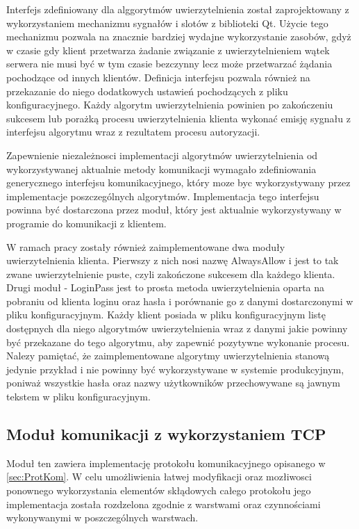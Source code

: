 Interfejs zdefiniowany dla alggorytmów uwierzytelnienia został
zaprojektowany z wykorzystaniem mechanizmu sygnałów i slotów z
biblioteki Qt. Użycie tego mechanizmu pozwala na znacznie bardziej
wydajne wykorzystanie zasobów, gdyż w czasie gdy klient przetwarza
żadanie związanie z uwierzytelnieniem wątek serwera nie musi być w tym
czasie bezczynny lecz może przetwarzać żądania pochodzące od innych
klientów. Definicja interfejsu pozwala również na przekazanie do niego
dodatkowych ustawień pochodzących z pliku konfiguracyjnego. Każdy
algorytm uwierzytelnienia powinien po zakończeniu sukcesem lub porażką
procesu uwierzytelnienia klienta wykonać emisję sygnału z interfejsu
algorytmu wraz z rezultatem procesu autoryzacji.

Zapewnienie niezależnosci implementacji algorytmów uwierzytelnienia od
wykorzystywanej aktualnie metody komunikacji wymagało zdefiniowania
generycznego interfejsu komunikacyjnego, który moze byc wykorzystywany
przez implementacje poszczególnych algorytmów. Implementacja tego
interfejsu powinna być dostarczona przez moduł, który jest aktualnie
wykorzystywany w programie do komunikacji z klientem.

W ramach pracy zostały również zaimplementowane dwa moduły
uwierzytelnienia klienta. Pierwszy z nich nosi nazwę AlwaysAllow i
jest to tak zwane uwierzytelnienie puste, czyli zakończone sukcesem
dla każdego klienta. Drugi moduł - LoginPass jest to prosta metoda
uwierzytelnienia oparta na pobraniu od klienta loginu oraz hasła i
porównanie go z danymi dostarczonymi w pliku konfiguracyjnym. Każdy
klient posiada w pliku konfiguracyjnym listę dostępnych dla niego
algorytmów uwierzytelnienia wraz z danymi jakie powinny być przekazane
do tego algorytmu, aby zapewnić pozytywne wykonanie procesu. Nalezy
pamiętać, że zaimplementowane algorytmy uwierzytelnienia stanową
jedynie przykład i nie powinny być wykorzystywane w systemie
produkcyjnym, poniważ wszystkie hasła oraz nazwy użytkowników
przechowywane są jawnym tekstem w pliku konfiguracyjnym.

\subsection[Moduł TCP][Moduł komunikacji z wykorzystaniem TCP]{Moduł komunikacji z wykorzystaniem TCP}

Moduł ten zawiera implementację protokołu komunikacyjnego opisanego w
\ref{sec:ProtKom}. W celu umożliwienia łatwej modyfikacji oraz
mozłiwosci ponownego wykorzystania elementów skłądowych całego
protokołu jego implementacja została rozdzelona zgodnie z warstwami
oraz czynnościami wykonywanymi w poszczególnych warstwach.

